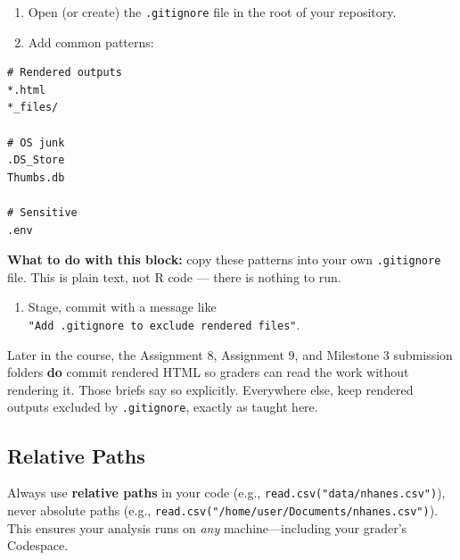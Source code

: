 \documentclass[
  letterpaper,
  DIV=11,
  numbers=noendperiod,
  oneside]{scrreprt}
\providecommand{\tightlist}{%
  \setlength{\itemsep}{0pt}\setlength{\parskip}{0pt}}
\begin{document}
\begin{enumerate}
\def\labelenumi{\arabic{enumi}.}
\tightlist
\item
  Open (or create) the \texttt{.gitignore} file in the root of your
  repository.
\item
  Add common patterns:
\end{enumerate}

\begin{verbatim}
# Rendered outputs
*.html
*_files/

# OS junk
.DS_Store
Thumbs.db

# Sensitive
.env
\end{verbatim}

\textbf{What to do with this block:} copy these patterns into your own
\texttt{.gitignore} file. This is plain text, not R code --- there is
nothing to run.

\begin{enumerate}
\def\labelenumi{\arabic{enumi}.}
\setcounter{enumi}{2}
\tightlist
\item
  Stage, commit with a message like
  \texttt{"Add\ .gitignore\ to\ exclude\ rendered\ files"}.
\end{enumerate}

\begin{tcolorbox}[enhanced jigsaw, title=\textcolor{quarto-callout-note-color}{\faInfo}\hspace{0.5em}{One named exception to the *.html rule}, arc=.35mm, toptitle=1mm, colframe=quarto-callout-note-color-frame, toprule=.15mm, leftrule=.75mm, bottomtitle=1mm, opacityback=0, bottomrule=.15mm, coltitle=black, breakable, opacitybacktitle=0.6, titlerule=0mm, colback=white, left=2mm, colbacktitle=quarto-callout-note-color!10!white, rightrule=.15mm]

Later in the course, the Assignment 8, Assignment 9, and Milestone 3
submission folders \textbf{do} commit rendered HTML so graders can read
the work without rendering it. Those briefs say so explicitly.
Everywhere else, keep rendered outputs excluded by \texttt{.gitignore},
exactly as taught here.

\end{tcolorbox}

\subsection*{Relative Paths}\label{relative-paths}

Always use \textbf{relative paths} in your code (e.g.,
\texttt{read.csv("data/nhanes.csv")}), never absolute paths (e.g.,
\texttt{read.csv("/home/user/Documents/nhanes.csv")}). This ensures your
analysis runs on \emph{any} machine---including your grader's Codespace.
\end{document}
